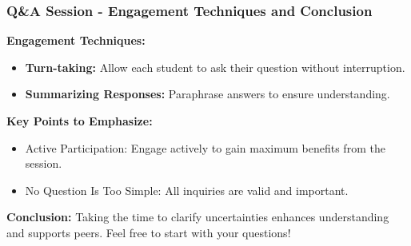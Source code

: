 \documentclass[aspectratio=169]{beamer}
\begin{document}
\begin{frame}[fragile]
    \frametitle{Q\&A Session - Engagement Techniques and Conclusion}
    \textbf{Engagement Techniques:}
    \begin{itemize}
        \item \textbf{Turn-taking:} Allow each student to ask their question without interruption.
        \item \textbf{Summarizing Responses:} Paraphrase answers to ensure understanding.
    \end{itemize}

    \textbf{Key Points to Emphasize:}
    \begin{itemize}
        \item Active Participation: Engage actively to gain maximum benefits from the session.
        \item No Question Is Too Simple: All inquiries are valid and important.
    \end{itemize}

    \textbf{Conclusion:} 
    Taking the time to clarify uncertainties enhances understanding and supports peers. Feel free to start with your questions!
\end{frame}
\end{document}
